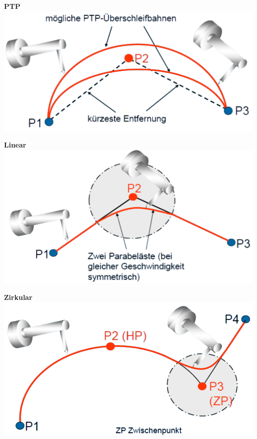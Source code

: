 \begin{minipage}{0.345\linewidth}
    \textbf{PTP} \newline
    \includegraphics[width=\linewidth]{./bilder/UeberschleifenPTP}
\end{minipage}
\begin{minipage}{0.32\linewidth}
    \textbf{Linear}\newline
    \includegraphics[width=\linewidth]{./bilder/UeberschleifenLin}
\end{minipage}
\begin{minipage}{0.32\linewidth}
    \textbf{Zirkular}\newline
    \includegraphics[width=\linewidth]{./bilder/UeberschleifenCirc}
\end{minipage}

